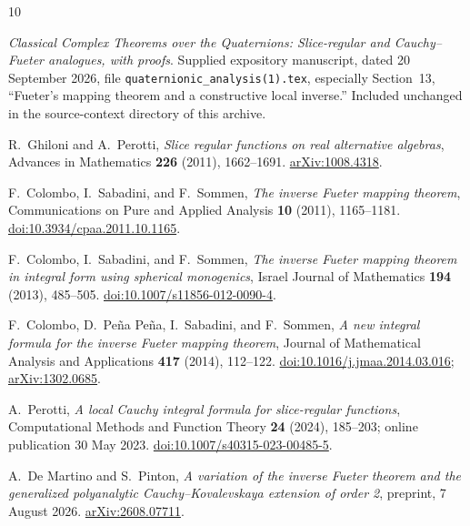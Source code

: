 \documentclass[11pt,a4paper]{article}
\numberwithin{equation}{section}
\theoremstyle{definition}
\theoremstyle{remark}
\begin{document}
\begin{thebibliography}{10}

\emph{Classical Complex Theorems over the Quaternions: Slice-regular and
Cauchy--Fueter analogues, with proofs}.
Supplied expository manuscript, dated 20 September 2026,
file \texttt{quaternionic\_analysis(1).tex}, especially Section~13,
``Fueter's mapping theorem and a constructive local inverse.''
Included unchanged in the source-context directory of this archive.

R.~Ghiloni and A.~Perotti,
\emph{Slice regular functions on real alternative algebras},
Advances in Mathematics \textbf{226} (2011), 1662--1691.
\href{https://arxiv.org/abs/1008.4318}{arXiv:1008.4318}.

F.~Colombo, I.~Sabadini, and F.~Sommen,
\emph{The inverse Fueter mapping theorem},
Communications on Pure and Applied Analysis \textbf{10} (2011), 1165--1181.
\href{https://doi.org/10.3934/cpaa.2011.10.1165}{doi:10.3934/cpaa.2011.10.1165}.

F.~Colombo, I.~Sabadini, and F.~Sommen,
\emph{The inverse Fueter mapping theorem in integral form using spherical
monogenics}, Israel Journal of Mathematics \textbf{194} (2013), 485--505.
\href{https://doi.org/10.1007/s11856-012-0090-4}{doi:10.1007/s11856-012-0090-4}.

F.~Colombo, D.~Pe\~na Pe\~na, I.~Sabadini, and F.~Sommen,
\emph{A new integral formula for the inverse Fueter mapping theorem},
Journal of Mathematical Analysis and Applications \textbf{417} (2014),
112--122.
\href{https://doi.org/10.1016/j.jmaa.2014.03.016}{doi:10.1016/j.jmaa.2014.03.016};
\href{https://arxiv.org/abs/1302.0685}{arXiv:1302.0685}.

A.~Perotti,
\emph{A local Cauchy integral formula for slice-regular functions},
Computational Methods and Function Theory \textbf{24} (2024), 185--203;
online publication 30 May 2023.
\href{https://doi.org/10.1007/s40315-023-00485-5}{doi:10.1007/s40315-023-00485-5}.

A.~De Martino and S.~Pinton,
\emph{A variation of the inverse Fueter theorem and the generalized
polyanalytic Cauchy--Kovalevskaya extension of order 2}, preprint,
7 August 2026.
\href{https://arxiv.org/abs/2608.07711}{arXiv:2608.07711}.

\end{thebibliography}
\end{document}
